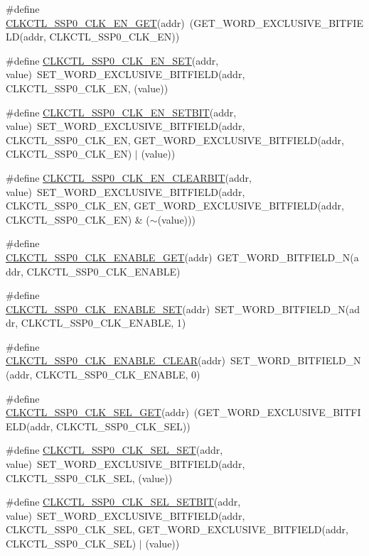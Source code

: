 \begin{DoxyCompactItemize}
\item 
\#define \hyperlink{a00544_a61ab23d67e72a32f56862b1a72ef9835}{CLKCTL\_\-SSP0\_\-CLK\_\-EN\_\-GET}(addr)~(GET\_\-WORD\_\-EXCLUSIVE\_\-BITFIELD(addr, CLKCTL\_\-SSP0\_\-CLK\_\-EN))
\item 
\#define \hyperlink{a00544_a9702a19675882882e418988c1fa0c1ca}{CLKCTL\_\-SSP0\_\-CLK\_\-EN\_\-SET}(addr, value)~SET\_\-WORD\_\-EXCLUSIVE\_\-BITFIELD(addr, CLKCTL\_\-SSP0\_\-CLK\_\-EN, (value))
\item 
\#define \hyperlink{a00544_acb5ea4f9a834234181d3a82d6aea1835}{CLKCTL\_\-SSP0\_\-CLK\_\-EN\_\-SETBIT}(addr, value)~SET\_\-WORD\_\-EXCLUSIVE\_\-BITFIELD(addr, CLKCTL\_\-SSP0\_\-CLK\_\-EN, GET\_\-WORD\_\-EXCLUSIVE\_\-BITFIELD(addr, CLKCTL\_\-SSP0\_\-CLK\_\-EN) $|$ (value))
\item 
\#define \hyperlink{a00544_ab478a5fe209efcd8510ee08234a6718e}{CLKCTL\_\-SSP0\_\-CLK\_\-EN\_\-CLEARBIT}(addr, value)~SET\_\-WORD\_\-EXCLUSIVE\_\-BITFIELD(addr, CLKCTL\_\-SSP0\_\-CLK\_\-EN, GET\_\-WORD\_\-EXCLUSIVE\_\-BITFIELD(addr, CLKCTL\_\-SSP0\_\-CLK\_\-EN) \& ($\sim$(value)))
\item 
\#define \hyperlink{a00544_a7b1fb51f1b99db79c8f202a49496839b}{CLKCTL\_\-SSP0\_\-CLK\_\-ENABLE\_\-GET}(addr)~GET\_\-WORD\_\-BITFIELD\_\-N(addr, CLKCTL\_\-SSP0\_\-CLK\_\-ENABLE)
\item 
\#define \hyperlink{a00544_a8a007db189787cf2ed90f1f793ec850c}{CLKCTL\_\-SSP0\_\-CLK\_\-ENABLE\_\-SET}(addr)~SET\_\-WORD\_\-BITFIELD\_\-N(addr, CLKCTL\_\-SSP0\_\-CLK\_\-ENABLE, 1)
\item 
\#define \hyperlink{a00544_a6b75ab67d0e077ac5317598bf012d565}{CLKCTL\_\-SSP0\_\-CLK\_\-ENABLE\_\-CLEAR}(addr)~SET\_\-WORD\_\-BITFIELD\_\-N(addr, CLKCTL\_\-SSP0\_\-CLK\_\-ENABLE, 0)
\item 
\#define \hyperlink{a00544_a83231a43143370376e43b4bf53e0645e}{CLKCTL\_\-SSP0\_\-CLK\_\-SEL\_\-GET}(addr)~(GET\_\-WORD\_\-EXCLUSIVE\_\-BITFIELD(addr, CLKCTL\_\-SSP0\_\-CLK\_\-SEL))
\item 
\#define \hyperlink{a00544_a96df3d8ab8f1617c14482f59dd8a9582}{CLKCTL\_\-SSP0\_\-CLK\_\-SEL\_\-SET}(addr, value)~SET\_\-WORD\_\-EXCLUSIVE\_\-BITFIELD(addr, CLKCTL\_\-SSP0\_\-CLK\_\-SEL, (value))
\item 
\#define \hyperlink{a00544_a6875ed7f0e6f8e7f09d23fd08cd43614}{CLKCTL\_\-SSP0\_\-CLK\_\-SEL\_\-SETBIT}(addr, value)~SET\_\-WORD\_\-EXCLUSIVE\_\-BITFIELD(addr, CLKCTL\_\-SSP0\_\-CLK\_\-SEL, GET\_\-WORD\_\-EXCLUSIVE\_\-BITFIELD(addr, CLKCTL\_\-SSP0\_\-CLK\_\-SEL) $|$ (value))
\item 

\end{DoxyCompactItemize}
